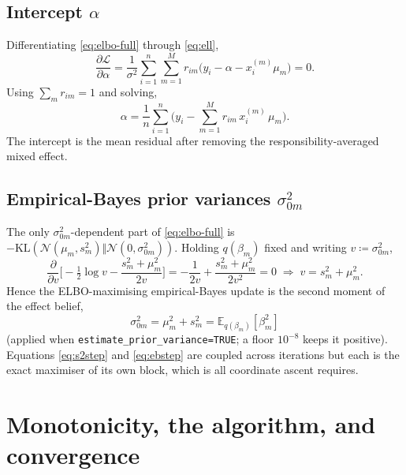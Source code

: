 \documentclass[11pt]{article}
\newcommand{\E}{\mathbb{E}}
\newcommand{\KL}{\mathrm{KL}}
\newcommand{\Nor}{\mathcal{N}}
\newcommand{\sigsq}{\sigma^{2}}
\newcommand{\sigz}[1]{\sigma_{0#1}^{2}}
\newcommand{\xim}{x_i^{(m)}}
\newcommand{\half}{\tfrac{1}{2}}
\theoremstyle{plain}
\theoremstyle{remark}
\begin{document}
\subsection{Intercept $\alpha$}
Differentiating \eqref{eq:elbo-full} through \eqref{eq:ell},
\begin{equation}
  \frac{\partial\mathcal L}{\partial\alpha}
  =\frac{1}{\sigsq}\sum_{i=1}^{n}\sum_{m=1}^{M} r_{im}\big(y_i-\alpha-\xim\mu_m\big)=0 .
\end{equation}
Using $\sum_m r_{im}=1$ and solving,
\begin{equation}\label{eq:alphastep}
\boxed{\;
  \alpha=\frac{1}{n}\sum_{i=1}^{n}\Big(y_i-\sum_{m=1}^{M} r_{im}\,\xim\,\mu_m\Big).
\;}
\end{equation}
The intercept is the mean residual after removing the responsibility-averaged
mixed effect.

\subsection{Empirical-Bayes prior variances $\sigz{m}$}
The only $\sigz{m}$-dependent part of \eqref{eq:elbo-full} is
$-\KL(\Nor(\mu_m,s_m^2)\Vert\Nor(0,\sigz{m}))$. Holding $q(\beta_m)$ fixed and
writing $v\coloneqq\sigz{m}$,
\begin{equation}
  \frac{\partial}{\partial v}\Big[-\half\log v-\frac{s_m^2+\mu_m^2}{2v}\Big]
  =-\frac{1}{2v}+\frac{s_m^2+\mu_m^2}{2v^2}=0
  \;\Longrightarrow\;
  v=s_m^2+\mu_m^2 .
\end{equation}
Hence the ELBO-maximising empirical-Bayes update is the second moment of the
effect belief,
\begin{equation}\label{eq:ebstep}
\boxed{\;
  \sigz{m}=\mu_m^2+s_m^2=\E_{q(\beta_m)}[\beta_m^2]
\;}
\end{equation}
(applied when \texttt{estimate\_prior\_variance=TRUE}; a floor $10^{-8}$ keeps it
positive). Equations \eqref{eq:s2step} and \eqref{eq:ebstep} are coupled across
iterations but each is the exact maximiser of its own block, which is all
coordinate ascent requires.

\section{Monotonicity, the algorithm, and convergence}\label{sec:monotone}
\end{document}
